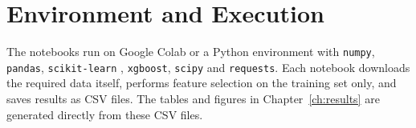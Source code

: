 \documentclass[../main.tex]{subfiles}
\begin{document}
\section{Environment and Execution}

The notebooks run on Google Colab or a Python environment with \texttt{numpy}, \texttt{pandas}, \texttt{scikit-learn} \cite{pedregosa2011scikit}, \texttt{xgboost}, \texttt{scipy} and \texttt{requests}. Each notebook downloads the required data itself, performs feature selection on the training set only, and saves results as CSV files. The tables and figures in Chapter~\ref{ch:results} are generated directly from these CSV files.
\end{document}
